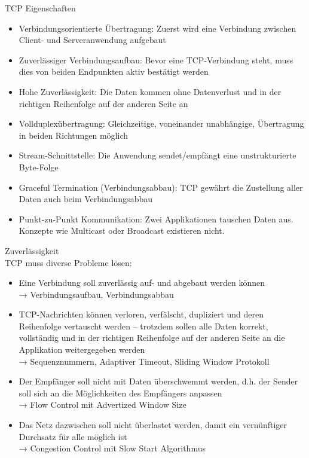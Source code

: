 \begin{definition}{TCP} Eigenschaften
    \begin{itemize}
        \item Verbindungsorientierte Übertragung: Zuerst wird eine Verbindung zwischen Client- und Serveranwendung aufgebaut
        \item Zuverlässiger Verbindungsaufbau: Bevor eine TCP-Verbindung steht, muss dies von beiden Endpunkten aktiv bestätigt werden
        \item Hohe Zuverlässigkeit: Die Daten kommen ohne Datenverlust und in der richtigen Reihenfolge auf der anderen Seite an
        \item Vollduplexübertragung: Gleichzeitige, voneinander unabhängige, Übertragung in beiden Richtungen möglich
        \item Stream-Schnittstelle: Die Anwendung sendet/empfängt eine unstrukturierte Byte-Folge
        \item Graceful Termination (Verbindungsabbau): TCP gewährt die Zustellung aller Daten auch beim Verbindungsabbau
        \item Punkt-zu-Punkt Kommunikation: Zwei Applikationen tauschen Daten aus. Konzepte wie Multicast oder Broadcast existieren nicht.
    \end{itemize}
\end{definition}

\begin{definition}{Zuverlässigkeit}\\
    TCP muss diverse Probleme lösen:
    \begin{itemize}
        \item Eine Verbindung soll zuverlässig auf- und abgebaut werden können\\
        → Verbindungsaufbau, Verbindungsabbau
        \item TCP-Nachrichten können verloren, verfälscht, dupliziert und deren Reihenfolge vertauscht werden – trotzdem sollen alle Daten korrekt, vollständig und in der richtigen Reihenfolge auf der anderen Seite an die Applikation weitergegeben werden\\
        → Sequenznummern, Adaptiver Timeout, Sliding Window Protokoll
        \item Der Empfänger soll nicht mit Daten überschwemmt werden, d.h. der Sender soll sich an die Möglichkeiten des Empfängers anpassen\\
        → Flow Control mit Advertized Window Size
        \item Das Netz dazwischen soll nicht überlastet werden, damit ein vernünftiger Durchsatz für alle möglich ist\\
        → Congestion Control mit Slow Start Algorithmus
    \end{itemize}
\end{definition}

